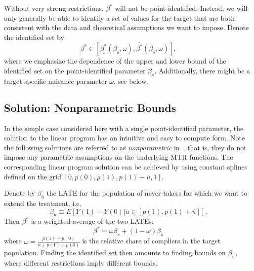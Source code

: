 \documentclass[12pt,a4paper,english]{article} %
\numberwithin{equation}{section}
\theoremstyle{definition}
\theoremstyle{remark}
\theoremstyle{plain}
\begin{document}
Without very strong restrictions, $\beta^*$ will not be point-identified.
Instead, we will only generally be able to identify a set of values for the target that are both consistent with the data and theoretical assumptions we want to impose.
Denote the identified set by
\begin{equation*}
  \beta^* \in [\underline{\beta^*}(\beta_s, \omega), \overline{\beta^*}(\beta_s, \omega)],
\end{equation*}
where we emphasize the dependence of the upper and lower bound of the identified set on the point-identified parameter $\beta_s$.
Additionally, there might be a target specific nuisance parameter $\omega$, see below.

\subsection{Solution: Nonparametric Bounds}
In the simple case considered here with a single point-identified parameter, the solution to the linear program has an intuitive and easy to compute form.
Note the following solutions are referred to as \textit{nonparametric} in~\cite{mogstad2018using}, that is, they do not impose any parametric assumptions on the underlying MTR functions.
The corresponding linear program solution can be achieved by using constant splines defined on the grid $[0, p(0), p(1), p(1) + \overline{u}, 1]$.

Denote by $\beta_{\overline{u}}$ the LATE for the population of never-takers for which we want to extend the treatment, i.e.
\begin{equation*}
  \beta_{\overline{u}} \equiv E[Y(1) - Y(0) | u \in [p(1), p(1) + \overline{u}]].
\end{equation*}
Then $\beta^*$ is a weighted average of the two LATEs:\@
\begin{equation*}
  \beta^* = \omega\beta_s + (1-\omega)\beta_{\overline{u}}
\end{equation*}
where $\omega = \frac{p(1) - p(0)}{\overline{u} + p(1) - p(0)}$ is the relative share of compliers in the target population.
Finding the identified set then amounts to finding bounds on $\beta_{\overline{u}}$, where different restrictions imply different bounds.
\end{document}
